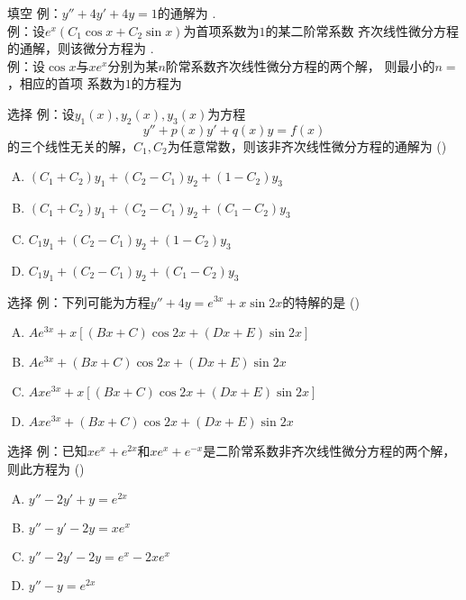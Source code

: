 \begin{frame}{填空}
	\linespread{1.5}
	\alert{例：}$y''+4y'+4y=1$的通解为
	\underline{\;}.\\[1em]
	
	\alert{例：}设$e^x(C_1\cos x+C_2\sin x)$为首项系数为$1$的某二阶常系数
	齐次线性微分方程的通解，则该微分方程为
	\underline{\;}.\\[1em]
	
	\alert{例：}设$\cos x$与$xe^x$分别为某$n$阶常系数齐次线性微分方程的两个解，
	则最小的$n=$\underline{\;}，相应的首项
	系数为$1$的方程为\underline{\uncover<5->{\;\b{$
	y^{(4)}-2y^{(3)}+2y''-2y'+y=0$}\;}}
	
\end{frame}

\begin{frame}{选择}
	\linespread{1.3}
	\alert{例：}设$y_1(x),y_2(x),y_3(x)$为方程
	$$y''+p(x)y'+q(x)y=f(x)$$
	的三个线性无关的解，$C_1,C_2$为任意常数，则该非齐次线性微分方程的通解为
	(\underline{\;})
	\begin{enumerate}[(A)]
	  \item $(C_1+C_2)y_1+(C_2-C_1)y_2+(1-C_2)y_3$
	  \item $(C_1+C_2)y_1+(C_2-C_1)y_2+(C_1-C_2)y_3$
	  \item $C_1y_1+(C_2-C_1)y_2+(1-C_2)y_3$
	  \item $C_1y_1+(C_2-C_1)y_2+(C_1-C_2)y_3$
	\end{enumerate}
\end{frame}

\begin{frame}{选择}
	\linespread{1.5}
	\alert{例：}下列可能为方程$y''+4y=e^{3x}+x\sin 2x$的特解的是
	(\underline{\;})
	\begin{enumerate}[(A)]
	  \item $Ae^{3x}+x[(Bx+C)\cos2x+(Dx+E)\sin2x]$
	  \item $Ae^{3x}+(Bx+C)\cos2x+(Dx+E)\sin2x$
	  \item $Axe^{3x}+x[(Bx+C)\cos2x+(Dx+E)\sin2x]$
	  \item $Axe^{3x}+(Bx+C)\cos2x+(Dx+E)\sin2x$
	\end{enumerate}
\end{frame}

\begin{frame}{选择}
	\linespread{1.3}
	\alert{例：}已知$xe^x+e^{2x}$和$xe^x+e^{-x}$是二阶常系数非齐次线性微分方程的两个解，
	则此方程为
	(\underline{\;})
	\begin{enumerate}[(A)]
	  \item $y''-2y'+y=e^{2x}$
	  \item $y''-y'-2y=xe^{x}$
	  \item $y''-2y'-2y=e^x-2xe^{x}$
	  \item $y''-y=e^{2x}$
	\end{enumerate}
\end{frame}

